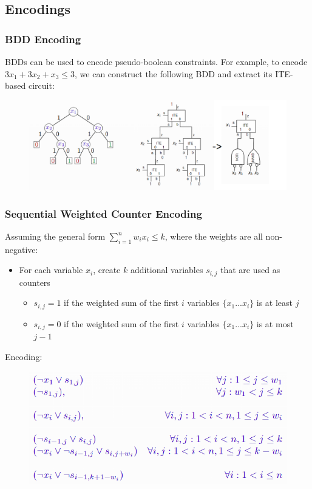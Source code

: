 \documentclass[10pt,a4paper]{report}
\begin{document}
\subsection{Encodings}
\subsubsection{BDD Encoding}
BDDs can be used to encode pseudo-boolean constraints. For example, to encode $3x_1 + 3x_2 + x_3 \leq 3$, we can construct the following BDD and extract its ITE-based circuit:
\begin{figure}[H]
    \centering
    \includegraphics[scale=0.5]{18.png}
\end{figure}
\subsubsection{Sequential Weighted Counter Encoding}
Assuming the general form $\sum_{i=1}^n w_ix_i \leq k$, where the weights are all non-negative:
\begin{itemize}
    \item For each variable $x_i$, create $k$ additional variables $s_{i,j}$ that are used as counters
    \begin{itemize}
        \item $s_{i,j} = 1$ if the weighted sum of the first $i$ variables $\{x_1 . . . x_i\}$ is at least $j$
        \item $s_{i,j} = 0$ if the weighted sum of the first $i$ variables $\{x_1 . . . x_i\}$ is at most $j-1$
    \end{itemize}
\end{itemize}
Encoding:
\begin{figure}[H]
    \centering
    \includegraphics[scale=0.5]{19.png}
\end{figure}
\end{document}
